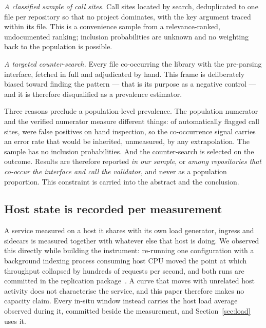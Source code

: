 \documentclass[pdflatex,sn-basic,twocolumn]{sn-jnl}%
\begin{document}
\emph{A classified sample of call sites.} Call sites located by search,
deduplicated to one file per repository so that no project dominates, with the
key argument traced within its file. This is a convenience sample from a
relevance-ranked, undocumented ranking; inclusion probabilities are unknown and
no weighting back to the population is possible.

\emph{A targeted counter-search.} Every file co-occurring the library with the
pre-parsing interface, fetched in full and adjudicated by hand. This frame is
deliberately biased toward finding the pattern --- that is its purpose as a
negative control --- and it is therefore disqualified as a prevalence estimator.

Three reasons preclude a population-level prevalence. The population numerator
and the verified numerator measure different things: of \AdjudicatedTotal{}
automatically flagged call sites, \AdjudicatedFalsePositive{} were false
positives on hand inspection, so the co-occurrence signal carries an error rate
that would be inherited, unmeasured, by any extrapolation. The sample has no
inclusion probabilities. And the counter-search is selected on the outcome.
Results are therefore reported \emph{in our sample}, or \emph{among repositories
that co-occur the interface and call the validator}, and never as a population
proportion. This constraint is carried into the abstract and the conclusion.

\subsection{Host state is recorded per measurement}\label{sec:hoststate}

A service measured on a host it shares with its own load generator, ingress and
sidecars is measured together with whatever else that host is doing. We observed
this directly while building the instrument: re-running one configuration with a
background indexing process consuming host CPU moved the point at which
throughput collapsed by hundreds of requests per second, and both runs are
committed in the replication package~\cite{artifact2026}. A curve that moves
with unrelated host activity does not characterise the service, and this paper
therefore makes no capacity claim. Every in-situ window instead carries the host
load average observed during it, committed beside the measurement, and
Section~\ref{sec:load} uses it.

\end{document}
